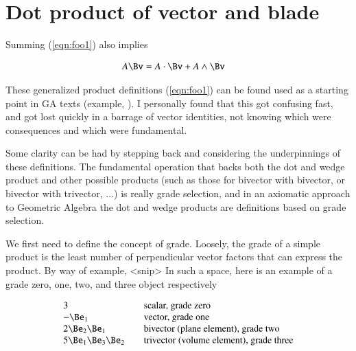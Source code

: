%

\chapter{Dot product of vector and blade}
\label{chap:dotBlade}
{}
\date{Aug 11, 2009}

\beginArtWithToc



Summing (\ref{eqn:foo1}) also implies 

\begin{align}\label{eqn:foo2}
A \Bv &= A \cdot \Bv + A \wedge \Bv
\end{align}

These generalized product definitions (\ref{eqn:foo1}) can be found used as a starting point in GA texts (example, \cite{hestenes1999nfc}).  I personally found that this got confusing fast, and got lost quickly in a barrage of vector identities, not knowing which were consequences and which were fundamental.

Some clarity can be had by stepping back and considering the underpinnings of these definitions.  The fundamental operation that backs both the dot and wedge product and other possible products (such as those for bivector with bivector, or bivector with trivector, ...) is really grade selection, and in an
axiomatic approach to Geometric Algebra the dot and wedge products are definitions based on grade selection.

We first need to define the concept of grade.  Loosely, the grade of a simple product is the least number of perpendicular vector factors that can express the product.  By way of example, <snip>
In such a space, here is an example of a grade zero, one, two, and three object respectively

\begin{align*}
\begin{array}{l l}
3 & \quad \text{scalar, grade zero} \\
-\Be_1 & \quad \text{vector, grade one} \\
2 \Be_2 \Be_1 & \quad \text{bivector (plane element), grade two} \\
5 \Be_1 \Be_3 \Be_2 & \quad \text{trivector (volume element), grade three} \\
\end{array}
\end{align*}

